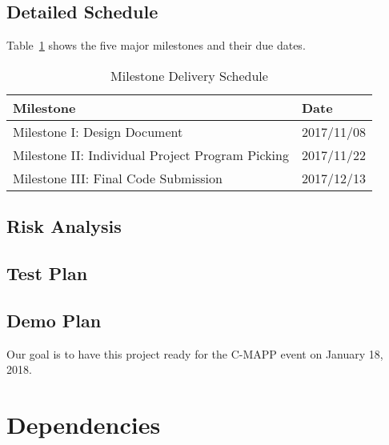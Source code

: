 \documentclass[titlepage,12pt]{article}
\begin{document}
\subsection{Detailed Schedule}
Table~\ref{tab:milestones} shows the five major milestones and their due dates.
\begin{table}[H]
    \caption{Milestone Delivery Schedule}
    \label{tab:milestones}
    \centering
    \begin{tabular}{|l|l|}
        \hline
        \textbf{Milestone} & \textbf{Date} \\
        \hline\hline
        Milestone I: Design Document & 2017/11/08 \\
        \hline
        Milestone II: Individual Project Program Picking & 2017/11/22 \\
        \hline
        Milestone III: Final Code Submission & 2017/12/13 \\
        \hline
    \end{tabular}
\end{table}

\subsection{Risk Analysis}

\subsection{Test Plan}

\subsection{Demo Plan}
Our goal is to have this project ready for the C-MAPP event on January 18, 2018.

\section{Dependencies}
\end{document}
